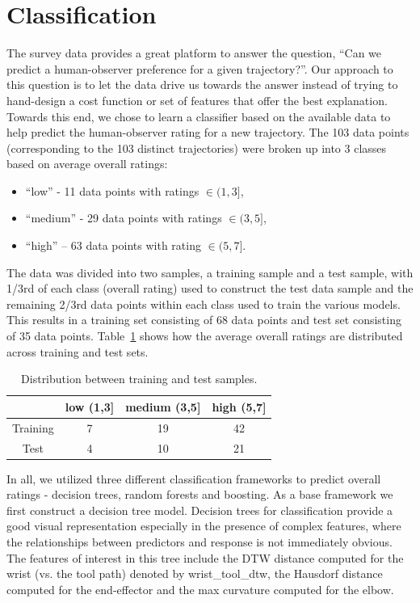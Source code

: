 \documentclass[letterpaper, 10 pt, conference]{ieeeconf}  %
\begin{document}
\section{Classification}
The survey data provides a great platform to answer the question, ``Can we predict a human-observer preference for a given trajectory?''. Our approach to this question is to let the data drive us towards the answer instead of trying to hand-design a cost function or set of features that offer the best explanation. Towards this end, we chose to learn a classifier based on the available data to help predict the human-observer rating for a new trajectory. The 103 data points (corresponding to the 103 distinct trajectories) were broken up into 3 classes based on average overall ratings:
\begin{itemize}
\item “low” - 11 data points with ratings $\in (1,3]$,
\item “medium”  - 29 data points with ratings $\in (3,5]$,
\item “high” – 63 data points with rating $\in (5,7]$.
\end{itemize}
The data was divided into two samples, a training sample and a test sample, with 1/3rd of each class (overall rating) used to construct the test data sample and the remaining 2/3rd data points within each class used to train the various models. This results in a training set consisting of 68 data points and test set consisting of 35 data points. Table~\ref{tab:test_training} shows how the average overall ratings are distributed across training and test sets.
\begin{table}[h]
\begin{centering}
\begin{tabular}{|c|c|c|c|}
\hline
 & low (1,3] & medium (3,5] & high (5,7] \\ \hline
Training & 7 & 19 & 42 \\ \hline
Test & 4 & 10 & 21 \\ \hline
\end{tabular}
\caption{Distribution between training and test samples.}
\label{tab:test_training}
\end{centering}
\end{table}

In all, we utilized three different classification frameworks to predict overall ratings - decision trees, random forests and boosting. As a base framework we first construct a decision tree model.  Decision trees for classification provide a good visual representation especially in the presence of complex features, where the relationships between predictors and response is not immediately obvious. The features of interest in this tree include the DTW distance computed for the wrist (vs. the tool path) denoted by wrist\_tool\_dtw, the Hausdorf distance computed for the end-effector and the max curvature computed for the elbow. 
\end{document}
